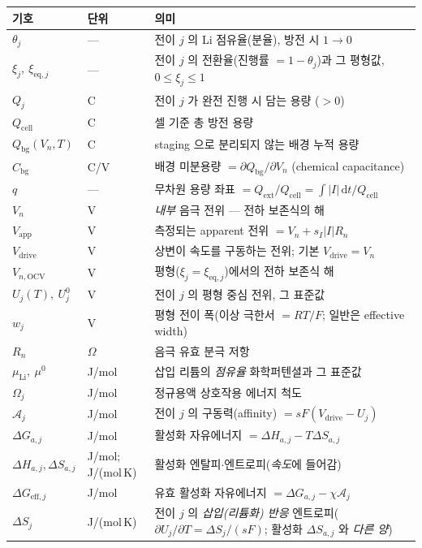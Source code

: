 \documentclass[11pt,a4paper]{article}
\newcommand{\dd}{\mathrm{d}}
\newcommand{\eff}{\mathrm{eff}}
\newcommand{\eq}{\mathrm{eq}}
\newcommand{\app}{\mathrm{app}}
\newcommand{\drive}{\mathrm{drive}}
\newcommand{\cell}{\mathrm{cell}}
\newcommand{\bg}{\mathrm{bg}}
\newcommand{\ext}{\mathrm{ext}}
\newcommand{\OCV}{\mathrm{OCV}}
\begin{document}
\begin{longtable}{p{} p{} p{}}
\toprule 기호 & 단위 & 의미 \\ \midrule \endhead
$\theta_j$ & --- & 전이 $j$ 의 Li 점유율(분율), 방전 시 $1\to0$ \\
$\xi_j,\ \xi_{\eq,j}$ & --- & 전이 $j$ 의 전환율(진행률 $=1-\theta_j$)과 그 평형값, $0\le\xi_j\le1$ \\
$Q_j$ & C & 전이 $j$ 가 완전 진행 시 담는 용량 ($>0$) \\
$Q_\cell$ & C & 셀 기준 총 방전 용량 \\
$Q_\bg(V_n,T)$ & C & staging 으로 분리되지 않는 배경 누적 용량 \\
$C_\bg$ & C/V & 배경 미분용량 $=\partial Q_\bg/\partial V_n$ (chemical capacitance) \\
$q$ & --- & 무차원 용량 좌표 $=Q_\ext/Q_\cell=\int|I|\,\dd t/Q_\cell$ \\
$V_n$ & V & \emph{내부} 음극 전위 — 전하 보존식의 해 \\
$V_\app$ & V & 측정되는 apparent 전위 $=V_n+s_I|I|R_n$ \\
$V_\drive$ & V & 상변이 속도를 구동하는 전위; 기본 $V_\drive=V_n$ \\
$V_{n,\OCV}$ & V & 평형($\xi_j=\xi_{\eq,j}$)에서의 전하 보존식 해 \\
$U_j(T),\ U_j^0$ & V & 전이 $j$ 의 평형 중심 전위, 그 표준값 \\
$w_j$ & V & 평형 전이 폭(이상 극한서 $=RT/F$; 일반은 effective width) \\
$R_n$ & $\Omega$ & 음극 유효 분극 저항 \\
$\mu_\mathrm{Li},\ \mu^0$ & J/mol & 삽입 리튬의 \emph{점유율} 화학퍼텐셜과 그 표준값 \\
$\Omega_j$ & J/mol & 정규용액 상호작용 에너지 척도 \\
$\mathcal A_j$ & J/mol & 전이 $j$ 의 구동력(affinity) $=sF(V_\drive-U_j)$ \\
$\Delta G_{a,j}$ & J/mol & 활성화 자유에너지 $=\Delta H_{a,j}-T\Delta S_{a,j}$ \\
$\Delta H_{a,j},\Delta S_{a,j}$ & {\footnotesize J/mol;\,J/(mol\,K)} & 활성화 엔탈피$\cdot$엔트로피(\emph{속도}에 들어감) \\
$\Delta G_{\eff,j}$ & J/mol & 유효 활성화 자유에너지 $=\Delta G_{a,j}-\chi\mathcal A_j$ \\
$\Delta S_j$ & J/(mol\,K) & 전이 $j$ 의 \emph{삽입(리튬화) 반응} 엔트로피($\partial U_j/\partial T=\Delta S_j/(sF)$; 활성화 $\Delta S_{a,j}$ 와 \emph{다른 양}) \\

\end{longtable}
\end{document}
